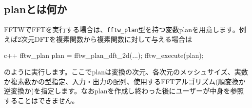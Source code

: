 \documentclass[12pt]{jreport}
\begin{document}
\subsection{planとは何か}
FFTWでFFTを実行する場合は、\texttt{fftw_plan}型を持つ変数planを用意します。例えば2次元DFTを複素関数から複素関数に対して与える場合は
\begin{codebox}{c++}
fftw_plan plan = fftw_plan_dft_2d(...);
fftw_execute(plan);  
\end{codebox}
のように実行します。ここでplanは変換の次元、各次元のメッシュサイズ、実数か複素数かの型指定、入力・出力の配列、使用するFFTアルゴリズム(順変換か逆変換か)を指定します。なおplanを作成し終わった後にユーザーが中身を参照することはできません。




\end{document}
